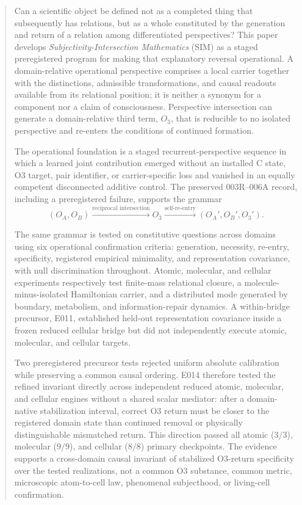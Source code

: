 \documentclass[11pt,a4paper]{article}
\newcommand{\OA}{\ensuremath{O_{A}}}
\newcommand{\OB}{\ensuremath{O_{B}}}
\newcommand{\Othree}{\ensuremath{O_{3}}}
\begin{document}
\begin{abstract}
Can a scientific object be defined not as a completed thing that subsequently has relations, but as a whole constituted by the generation and return of a relation among differentiated perspectives? This paper develops \emph{Subjectivity-Intersection Mathematics} (SIM) as a staged preregistered program for making that explanatory reversal operational. A domain-relative operational perspective comprises a local carrier together with the distinctions, admissible transformations, and causal readouts available from its relational position; it is neither a synonym for a component nor a claim of consciousness. Perspective intersection can generate a domain-relative third term, \Othree, that is reducible to no isolated perspective and re-enters the conditions of continued formation.

The operational foundation is a staged recurrent-perspective sequence in which a learned joint contribution emerged without an installed C state, O3 target, pair identifier, or carrier-specific loss and vanished in an equally competent disconnected additive control. The preserved 003R--006A record, including a preregistered failure, supports the grammar
\[
  (\OA,\OB) \xrightarrow{\text{reciprocal intersection}} \Othree
  \xrightarrow{\text{self-re-entry}} (\OA',\OB',\Othree').
\]

The same grammar is tested on constitutive questions across domains using six operational confirmation criteria: generation, necessity, re-entry, specificity, registered empirical minimality, and representation covariance, with null discrimination throughout. Atomic, molecular, and cellular experiments respectively test finite-mass relational closure, a molecule-minus-isolated Hamiltonian carrier, and a distributed mode generated by boundary, metabolism, and information-repair dynamics. A within-bridge precursor, E011, established held-out representation covariance inside a frozen reduced cellular bridge but did not independently execute atomic, molecular, and cellular targets.

Two preregistered precursor tests rejected uniform absolute calibration while preserving a common causal ordering. E014 therefore tested the refined invariant directly across independent reduced atomic, molecular, and cellular engines without a shared scalar mediator: after a domain-native stabilization interval, correct O3 return must be closer to the registered domain state than continued removal or physically distinguishable mismatched return. This direction passed all atomic ($3/3$), molecular ($9/9$), and cellular ($8/8$) primary checkpoints. The evidence supports a cross-domain causal invariant of stabilized O3-return specificity over the tested realizations, not a common O3 substance, common metric, microscopic atom-to-cell law, phenomenal subjecthood, or living-cell confirmation.
\end{abstract}
\end{document}

